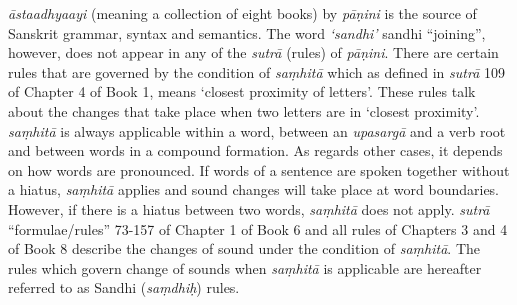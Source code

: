 \documentclass[11pt]{article}
\begin{document}
%
% 

\textit{ āstaadhyaayi} (meaning a collection of eight books) by \textit{pāṇini} is the source of Sanskrit grammar, syntax and semantics. The word  \textit{‘sandhi’} sandhi ``joining'', however, does not appear in any of the \textit{sutrā} (rules) of \textit{pāṇini}. There are certain rules that are governed by the condition of  \textit{saṃhitā} which as defined in \textit{sutrā} 109 of Chapter 4 of Book 1, means ‘closest proximity of letters’. These rules talk about the changes that take place when two letters are in ‘closest proximity’.
\textit{saṃhitā} is always applicable within a word, between an \textit{upasargā} and a verb root and between words in a compound formation. As regards other cases, it depends on how words are pronounced. If words of a sentence are spoken together without a hiatus,  \textit{saṃhitā} applies and sound changes will take place at word boundaries. However, if there is a hiatus between two words, \textit{saṃhitā} does not apply. 
 \textit{sutrā} ``formulae/rules'' 73-157 of Chapter 1 of Book 6 and all rules of Chapters 3 and 4 of Book 8 describe the changes of sound under the condition of \textit{saṃhitā}. The rules which govern change of sounds when \textit{saṃhitā} is applicable are hereafter referred to as Sandhi (\textit{saṃdhiḥ}) rules.
\end{document}
